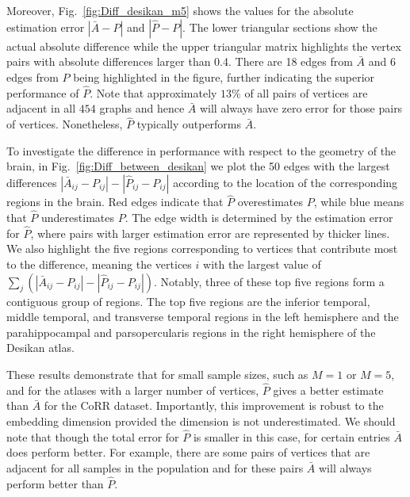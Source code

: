 \documentclass[10pt,letterpaper]{article}
\renewcommand{\hat}{\widehat}
\begin{document}
Moreover, Fig.~\ref{fig:Diff_desikan_m5} shows the values for the absolute estimation error $|\bar{A} - P|$ and $|\hat{P}-P|$. The lower triangular sections show the actual absolute difference while the upper triangular matrix highlights the vertex pairs with absolute differences larger than 0.4. 
There are 18 edges from $\bar{A}$ and 6 edges from $\hat{P}$ being highlighted in the figure, further indicating the superior performance of $\hat{P}$.
Note that approximately $13\%$ of all pairs of vertices are adjacent in all $454$ graphs and hence $\bar{A}$ will always have zero error for those pairs of vertices.
Nonetheless, $\hat{P}$ typically outperforms $\bar{A}$.

To investigate the difference in performance with respect to the geometry of the brain, 
in Fig.~\ref{fig:Diff_between_desikan} we plot the 50 edges with the largest differences $|\bar{A}_{ij} - P_{ij}| - |\hat{P}_{ij} - P_{ij}|$ according to the location of the corresponding regions in the brain. Red edges indicate that $\hat{P}$ overestimates $P$, while blue means that $\hat{P}$ underestimates $P$. The edge width is determined by the estimation error for $\hat{P}$, where pairs with larger estimation error are represented by thicker lines.
We also highlight the five regions corresponding to vertices that contribute most to the difference, meaning the vertices $i$ with the largest value of $\sum_j (|\bar{A}_{ij} - P_{ij}| - |\hat{P}_{ij} - P_{ij}|)$.
Notably, three of these top five regions form a contiguous group of regions.
The top five regions are the inferior temporal, middle temporal, and transverse temporal regions in the left hemisphere and the parahippocampal and parsopercularis regions in the right hemisphere of the Desikan atlas.

These results demonstrate that for small sample sizes, such as $M=1$ or $M=5$, and for the atlases with a larger number of vertices, $\hat{P}$ gives a better estimate than $\bar{A}$ for the CoRR dataset.
Importantly, this improvement is robust to the embedding dimension provided the dimension is not underestimated.
We should note that though the total error for $\hat{P}$ is smaller in this case, for certain entries $\bar{A}$ does perform better.
For example, there are some pairs of vertices that are adjacent for all samples in the population and for these pairs $\bar{A}$ will always perform better than $\hat{P}$. 
\end{document}
